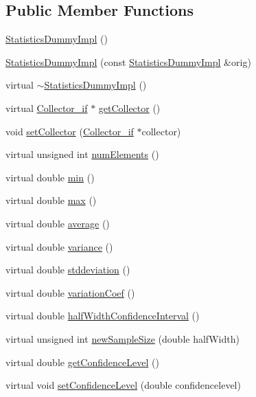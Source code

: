 \subsection*{Public Member Functions}
\begin{DoxyCompactItemize}
\item 
\hyperlink{class_statistics_dummy_impl_aa5ac252802bcd91b38f417ce082aa660}{Statistics\+Dummy\+Impl} ()
\item 
\hyperlink{class_statistics_dummy_impl_ab6420f6f66106745b6a2dce68bd6f0ed}{Statistics\+Dummy\+Impl} (const \hyperlink{class_statistics_dummy_impl}{Statistics\+Dummy\+Impl} \&orig)
\item 
virtual \hyperlink{class_statistics_dummy_impl_aa338e74273bf1ddffa467959b35c836a}{$\sim$\+Statistics\+Dummy\+Impl} ()
\item 
virtual \hyperlink{class_collector__if}{Collector\+\_\+if} $\ast$ \hyperlink{class_statistics_dummy_impl_ac17e897d6131550bcdf5b2243c26a43b}{get\+Collector} ()
\item 
void \hyperlink{class_statistics_dummy_impl_a6a6d3fc91a7afe22cb66d10760891fa0}{set\+Collector} (\hyperlink{class_collector__if}{Collector\+\_\+if} $\ast$collector)
\item 
virtual unsigned int \hyperlink{class_statistics_dummy_impl_a6669b3555223a6104fb31edacf577553}{num\+Elements} ()
\item 
virtual double \hyperlink{class_statistics_dummy_impl_afa54fbcf5b2cd94cd31144ceea0d3617}{min} ()
\item 
virtual double \hyperlink{class_statistics_dummy_impl_a5aa9311e22a79c8287ce77a5be16902b}{max} ()
\item 
virtual double \hyperlink{class_statistics_dummy_impl_a6a92fc5fc549b4e674e95d03e0adf6e3}{average} ()
\item 
virtual double \hyperlink{class_statistics_dummy_impl_a205e3cb135b3bea12d03826964930069}{variance} ()
\item 
virtual double \hyperlink{class_statistics_dummy_impl_aecd1ae947272fe51658fbac3cb3647e8}{stddeviation} ()
\item 
virtual double \hyperlink{class_statistics_dummy_impl_af1dff0a22b596cfca7aa123757f35d05}{variation\+Coef} ()
\item 
virtual double \hyperlink{class_statistics_dummy_impl_a544a2899b078f8a81199204870de61d0}{half\+Width\+Confidence\+Interval} ()
\item 
virtual unsigned int \hyperlink{class_statistics_dummy_impl_abb437988ddf2f5d75d3b62aa971da2e6}{new\+Sample\+Size} (double half\+Width)
\item 
virtual double \hyperlink{class_statistics_dummy_impl_a0705395b51a406e1d90664ba2c95d037}{get\+Confidence\+Level} ()
\item 
virtual void \hyperlink{class_statistics_dummy_impl_a73e9769979bfb2aa79eb40cf8a5572a1}{set\+Confidence\+Level} (double confidencelevel)
\end{DoxyCompactItemize}


